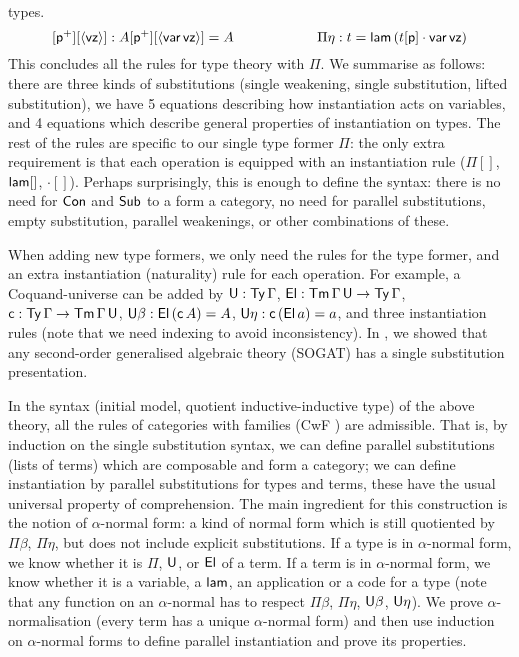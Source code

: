 \documentclass{easychair}
\begin{document}
types.
\[
[\mathsf{p}^+][\langle\mathsf{vz}\rangle] : A[\mathsf{p}^+][\langle\mathsf{var}\,\mathsf{vz}\rangle] = A \hspace{6em}\Pi\eta : t = \mathsf{lam}\,(t[\mathsf{p}]\cdot\mathsf{var}\,\mathsf{vz})
\]
This concludes all the rules for type theory with $\Pi$. We summarise
as follows: there are three kinds of substitutions (single weakening,
single substitution, lifted substitution), we have 5 equations
describing how instantiation acts on variables, and 4 equations which
describe general properties of instantiation on types. The rest of the
rules are specific to our single type former $\Pi$: the only extra
requirement is that each operation is equipped with an instantiation
rule ($\Pi[]$, $\mathsf{lam}[]$, ${\cdot}[]$). Perhaps surprisingly, this is
enough to define the syntax: there is no need for $\mathsf{Con}$ and $\mathsf{Sub}$ to
a form a category, no need for parallel substitutions, empty
substitution, parallel weakenings, or other combinations of these.

When adding new type formers, we only need the rules for the type
former, and an extra instantiation (naturality) rule for each
operation. For example, a Coquand-universe can be added by $\mathsf{U} :
\mathsf{Ty}\,\Gamma$, $\mathsf{El}:\mathsf{Tm}\,\Gamma\,\mathsf{U}\rightarrow\mathsf{Ty}\,\Gamma$,
$\mathsf{c}:\mathsf{Ty}\,\Gamma\rightarrow\mathsf{Tm}\,\Gamma\,\mathsf{U}$, $\mathsf{U}\beta : \mathsf{El}\,(\mathsf{c}\,A) = A$,
$\mathsf{U}\eta : \mathsf{c}\,(\mathsf{El}\,a) = a$, and three instantiation rules (note that
we need indexing to avoid inconsistency). In \cite{sogat}, we showed
that any second-order generalised algebraic theory (SOGAT) has a
single substitution presentation.

In the syntax (initial model, quotient inductive-inductive type) of
the above theory, all the rules of categories with families (CwF
\cite{DBLP:journals/corr/abs-1904-00827}) are admissible. That is, by
induction on the single substitution syntax, we can define parallel
substitutions (lists of terms) which are composable and form a
category; we can define instantiation by parallel substitutions for
types and terms, these have the usual universal property of
comprehension. The main ingredient for this construction is the notion
of $\alpha$-normal form: a kind of normal form which is still
quotiented by $\Pi\beta$, $\Pi\eta$, but does not include explicit
substitutions. If a type is in $\alpha$-normal form, we know whether
it is $\Pi$, $\mathsf{U}$, or $\mathsf{El}$ of a term. If a term is in $\alpha$-normal
form, we know whether it is a variable, a $\mathsf{lam}$, an application or a
code for a type (note that any function on an $\alpha$-normal has to
respect $\Pi\beta$, $\Pi\eta$, $\mathsf{U}\beta$, $\mathsf{U}\eta$). We prove
$\alpha$-normalisation (every term has a unique $\alpha$-normal form)
and then use induction on $\alpha$-normal forms to define parallel
instantiation and prove its properties.
\end{document}
